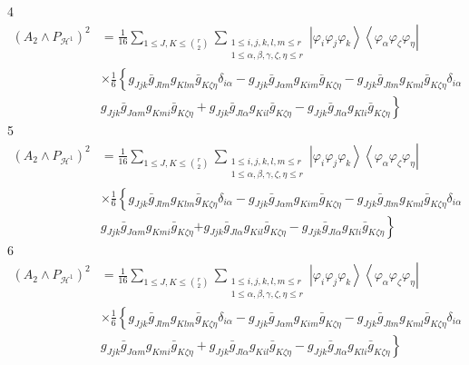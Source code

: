 \documentclass[aps,preprint]{revtex4}%
\begin{document}
4%
\begin{align}
\left(  A_{2}\wedge P_{\mathcal{H}^{1}}\right)  ^{2} &  =\frac{1}{16}%
\sum_{1\leq J,K\leq\binom{r}{2}}\sum_{\substack{1\leq i,j,k,l,m\leq
r\\1\leq\alpha,\beta,\gamma,\zeta,\eta\leq r}}\left\vert \varphi_{i}%
\varphi_{j}\varphi_{k}\right\rangle \left\langle \varphi_{\alpha}%
\varphi_{\zeta}\varphi_{\eta}\right\vert \\
&  \times\frac{1}{6}\left\{  g_{Jjk}\bar{g}_{Jlm}g_{Klm}\bar{g}_{K\zeta\eta
}\delta_{i\alpha}-g_{Jjk}\bar{g}_{J\alpha m}g_{Kim}\bar{g}_{K\zeta\eta
}-g_{Jjk}\bar{g}_{Jlm}g_{Kml}\bar{g}_{K\zeta\eta}\delta_{i\alpha}\right.  \\
&  \left.  g_{Jjk}\bar{g}_{J\alpha m}g_{Kmi}\bar{g}_{K\zeta\eta}+g_{Jjk}%
\bar{g}_{Jl\alpha}g_{Kil}\bar{g}_{K\zeta\eta}-g_{Jjk}\bar{g}_{Jl\alpha}%
g_{Kli}\bar{g}_{K\zeta\eta}\right\}
\end{align}
5%
\begin{align}
\left(  A_{2}\wedge P_{\mathcal{H}^{1}}\right)  ^{2} &  =\frac{1}{16}%
\sum_{1\leq J,K\leq\binom{r}{2}}\sum_{\substack{1\leq i,j,k,l,m\leq
r\\1\leq\alpha,\beta,\gamma,\zeta,\eta\leq r}}\left\vert \varphi_{i}%
\varphi_{j}\varphi_{k}\right\rangle \left\langle \varphi_{\alpha}%
\varphi_{\zeta}\varphi_{\eta}\right\vert \\
&  \times\frac{1}{6}\left\{  g_{Jjk}\bar{g}_{Jlm}g_{Klm}\bar{g}_{K\zeta\eta
}\delta_{i\alpha}-g_{Jjk}\bar{g}_{J\alpha m}g_{Kim}\bar{g}_{K\zeta\eta
}-g_{Jjk}\bar{g}_{Jlm}g_{Kml}\bar{g}_{K\zeta\eta}\delta_{i\alpha}\right.  \\
&  g_{Jjk}\bar{g}_{J\alpha m}g_{Kmi}\bar{g}_{K\zeta\eta}\left.  +g_{Jjk}%
\bar{g}_{Jl\alpha}g_{Kil}\bar{g}_{K\zeta\eta}-g_{Jjk}\bar{g}_{Jl\alpha}%
g_{Kli}\bar{g}_{K\zeta\eta}\right\}
\end{align}
6%
\begin{align}
\left(  A_{2}\wedge P_{\mathcal{H}^{1}}\right)  ^{2} &  =\frac{1}{16}%
\sum_{1\leq J,K\leq\binom{r}{2}}\sum_{\substack{1\leq i,j,k,l,m\leq
r\\1\leq\alpha,\beta,\gamma,\zeta,\eta\leq r}}\left\vert \varphi_{i}%
\varphi_{j}\varphi_{k}\right\rangle \left\langle \varphi_{\alpha}%
\varphi_{\zeta}\varphi_{\eta}\right\vert \\
&  \times\frac{1}{6}\left\{  g_{Jjk}\bar{g}_{Jlm}g_{Klm}\bar{g}_{K\zeta\eta
}\delta_{i\alpha}-g_{Jjk}\bar{g}_{J\alpha m}g_{Kim}\bar{g}_{K\zeta\eta
}-g_{Jjk}\bar{g}_{Jlm}g_{Kml}\bar{g}_{K\zeta\eta}\delta_{i\alpha}\right.  \\
&  \left.  g_{Jjk}\bar{g}_{J\alpha m}g_{Kmi}\bar{g}_{K\zeta\eta}+g_{Jjk}%
\bar{g}_{Jl\alpha}g_{Kil}\bar{g}_{K\zeta\eta}-g_{Jjk}\bar{g}_{Jl\alpha}%
g_{Kli}\bar{g}_{K\zeta\eta}\right\}
\end{align}
\end{document}
